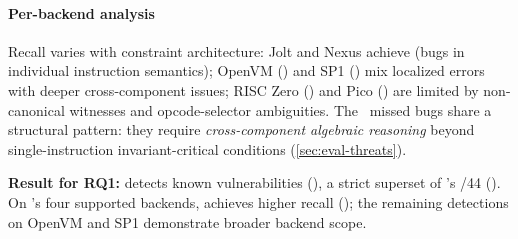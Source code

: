 \paragraph{Per-backend analysis}
Recall varies with constraint architecture: Jolt and Nexus achieve  (bugs in individual instruction semantics); OpenVM () and SP1 () mix localized errors with deeper cross-component issues; RISC Zero () and Pico () are limited by non-canonical witnesses and opcode-selector ambiguities. The ~missed bugs share a structural pattern: they require \emph{cross-component algebraic reasoning} beyond single-instruction invariant-critical conditions (\autoref{sec:eval-threats}).

\begin{mdframed}[
    backgroundcolor=gray!10,
    linecolor=white,
    skipabove=0.5em
    ]\noindent
    \textbf{Result for RQ1:} \tool detects  known vulnerabilities (), a strict superset of \arguzz's /44 (). On \arguzz's four supported backends, \tool achieves \tbd{$1.5\times$} higher recall (); the remaining detections on OpenVM and SP1 demonstrate broader backend scope.
\end{mdframed}

